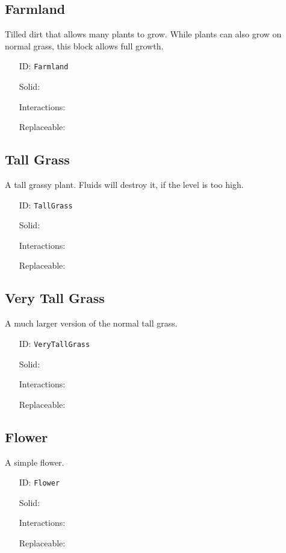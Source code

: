 \subsection{Farmland}\label{subsec:blocks_farmland}
Tilled dirt that allows many plants to grow.
While plants can also grow on normal grass, this block allows full growth.
\newline
\begin{itemize}[nosep]
    \item[ID:] \texttt{Farmland}
    \item[Solid:]  \Checkmark \item[Interactions:]  \XSolidBrush \item[Replaceable:]  \XSolidBrush
\end{itemize}

\subsection{Tall Grass}\label{subsec:blocks_tall grass}
A tall grassy plant. Fluids will destroy it, if the level is too high.
\newline
\begin{itemize}[nosep]
    \item[ID:] \texttt{TallGrass}
    \item[Solid:]  \XSolidBrush \item[Interactions:]  \XSolidBrush \item[Replaceable:]  \Checkmark
\end{itemize}

\subsection{Very Tall Grass}\label{subsec:blocks_very tall grass}
A much larger version of the normal tall grass.
\newline
\begin{itemize}[nosep]
    \item[ID:] \texttt{VeryTallGrass}
    \item[Solid:]  \XSolidBrush \item[Interactions:]  \XSolidBrush \item[Replaceable:]  \XSolidBrush
\end{itemize}

\subsection{Flower}\label{subsec:blocks_flower}
A simple flower.
\newline
\begin{itemize}[nosep]
    \item[ID:] \texttt{Flower}
    \item[Solid:]  \XSolidBrush \item[Interactions:]  \XSolidBrush \item[Replaceable:]  \Checkmark
\end{itemize}

